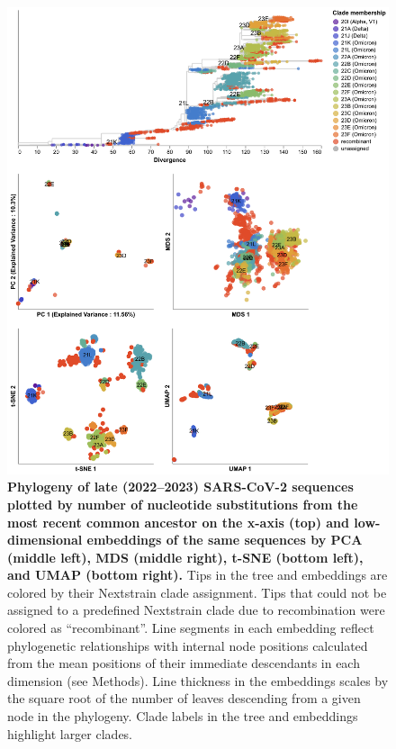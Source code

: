 \begin{figure}[!h]
\includegraphics[width=0.9\columnwidth]{figures/sarscov2-test-embeddings-by-Nextstrain_clade-clade.png}
\caption{{\bf Phylogeny of late (2022--2023) SARS-CoV-2 sequences plotted by number of nucleotide substitutions from the most recent common ancestor on the x-axis (top) and low-dimensional embeddings of the same sequences by PCA (middle left), MDS (middle right), t-SNE (bottom left), and UMAP (bottom right).}
  Tips in the tree and embeddings are colored by their Nextstrain clade assignment.
  Tips that could not be assigned to a predefined Nextstrain clade due to recombination were colored as ``recombinant''.
  Line segments in each embedding reflect phylogenetic relationships with internal node positions calculated from the mean positions of their immediate descendants in each dimension (see Methods).
  Line thickness in the embeddings scales by the square root of the number of leaves descending from a given node in the phylogeny.
  Clade labels in the tree and embeddings highlight larger clades.
}
\label{S_Fig_sarscov2_late_embeddings_by_Nextstrain_clade}
\end{figure}

